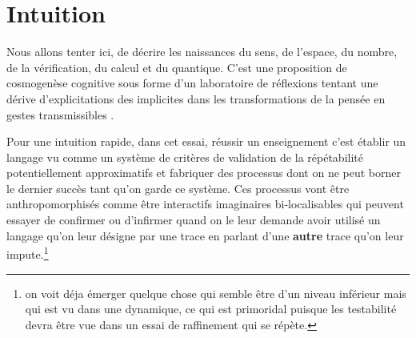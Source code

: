 \documentclass{article}
\begin{document}

\section{Intuition}
Nous allons tenter ici, de décrire les naissances   du sens, de l’espace, du nombre, de la vérification, du calcul et du quantique.
C’est une proposition de  cosmogenèse cognitive sous forme d'un laboratoire de réflexions tentant une dérive d'explicitations  des implicites dans  les transformations de la pensée en gestes transmissibles .


Pour une intuition rapide, dans cet essai,  réussir  un enseignement  c'est   établir un langage vu comme un système de critères de validation de la répétabilité  potentiellement approximatifs et fabriquer des processus   dont on ne peut borner le dernier succès tant qu'on garde ce système. Ces processus vont être anthropomorphisés comme être interactifs imaginaires bi-localisables qui peuvent essayer de  confirmer ou d'infirmer quand on le leur demande avoir utilisé un langage qu'on leur désigne par une trace en parlant d'une \textbf{autre}  trace qu'on leur impute.\footnote{
on voit déja émerger quelque chose qui semble être d'un niveau inférieur mais qui est vu dans une dynamique, ce qui est  primoridal puisque les testabilité devra être vue dans un essai de raffinement qui se répète.}
\end{document}

